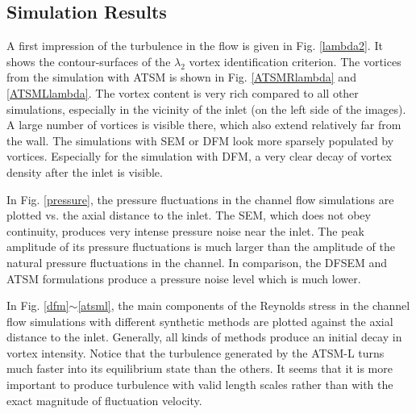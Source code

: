 \subsection{Simulation Results}

A first impression of the turbulence in the flow is given in Fig. \ref{lambda2}. It shows the contour-surfaces of the $\lambda_2$ vortex identification criterion. The vortices from the simulation with ATSM is shown in Fig. \ref{ATSMRlambda} and \ref{ATSMLlambda}. The vortex content is very rich compared to all other simulations, especially in the vicinity of the inlet (on the left side of the images). A large number of vortices is visible there, which also extend relatively far from the wall. The simulations with SEM or DFM look more sparsely populated by vortices. Especially for the simulation with DFM, a very clear decay of vortex density after the inlet is visible.

In Fig. \ref{pressure}, the pressure fluctuations in the channel flow simulations are plotted vs. the axial distance to the inlet. The SEM, which does not obey continuity, produces very intense pressure noise near the inlet. The peak amplitude of its pressure fluctuations is much larger than the amplitude of the natural pressure fluctuations in the channel. In comparison, the DFSEM and ATSM formulations produce a pressure noise level which is much lower. 

In Fig. \ref{dfm}$\sim$\ref{atsml}, the main components of the Reynolds stress in the channel flow simulations with different synthetic methods are plotted against the axial distance to the inlet. Generally, all kinds of methods produce an initial decay in vortex intensity. Notice that the turbulence generated by the ATSM-L turns much faster into its equilibrium state than the others. It seems that it is more important to produce turbulence with valid length scales rather than with the exact magnitude of fluctuation velocity.

